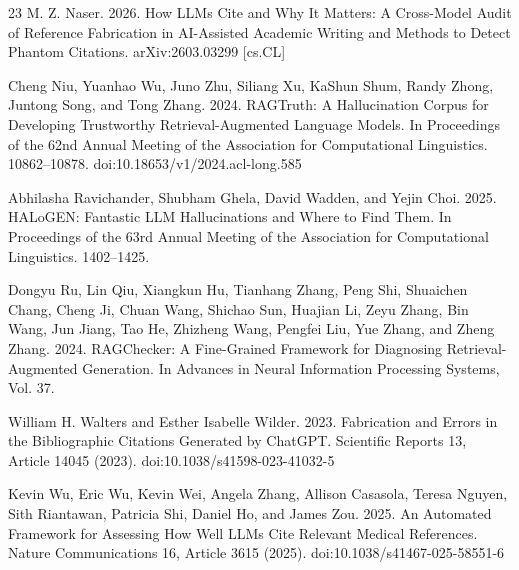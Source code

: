 \begin{thebibliography}{23}
 M. Z. Naser. 2026. How LLMs Cite and Why It Matters: A Cross-Model Audit of Reference Fabrication in AI-Assisted Academic Writing and Methods to Detect Phantom Citations. arXiv:2603.03299 [cs.CL]

 Cheng Niu, Yuanhao Wu, Juno Zhu, Siliang Xu, KaShun Shum, Randy Zhong, Juntong Song, and Tong Zhang. 2024. RAGTruth: A Hallucination Corpus for Developing Trustworthy Retrieval-Augmented Language Models. In Proceedings of the 62nd Annual Meeting of the Association for Computational Linguistics. 10862–10878. doi:10.18653/v1/2024.acl-long.585

 Abhilasha Ravichander, Shubham Ghela, David Wadden, and Yejin Choi. 2025. HALoGEN: Fantastic LLM Hallucinations and Where to Find Them. In Proceedings of the 63rd Annual Meeting of the Association for Computational Linguistics. 1402–1425.

 Dongyu Ru, Lin Qiu, Xiangkun Hu, Tianhang Zhang, Peng Shi, Shuaichen Chang, Cheng Ji, Chuan Wang, Shichao Sun, Huajian Li, Zeyu Zhang, Bin Wang, Jun Jiang, Tao He, Zhizheng Wang, Pengfei Liu, Yue Zhang, and Zheng Zhang. 2024. RAGChecker: A Fine-Grained Framework for Diagnosing Retrieval-Augmented Generation. In Advances in Neural Information Processing Systems, Vol. 37.

 William H. Walters and Esther Isabelle Wilder. 2023. Fabrication and Errors in the Bibliographic Citations Generated by ChatGPT. Scientific Reports 13, Article 14045 (2023). doi:10.1038/s41598-023-41032-5

 Kevin Wu, Eric Wu, Kevin Wei, Angela Zhang, Allison Casasola, Teresa Nguyen, Sith Riantawan, Patricia Shi, Daniel Ho, and James Zou. 2025. An Automated Framework for Assessing How Well LLMs Cite Relevant Medical References. Nature Communications 16, Article 3615 (2025). doi:10.1038/s41467-025-58551-6
\end{thebibliography}